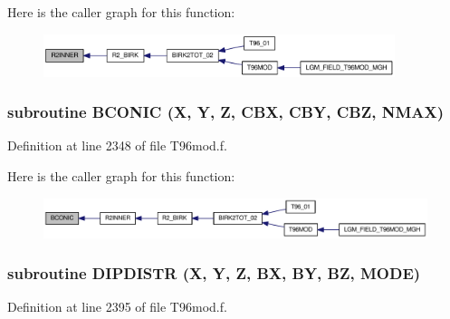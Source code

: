 Here is the caller graph for this function:\nopagebreak
\begin{figure}[H]
\begin{center}
\leavevmode
\includegraphics[width=291pt]{_t96mod_8f_717e6c5b669e682bef3f33b1a4a73796_icgraph}
\end{center}
\end{figure}
\hypertarget{_t96mod_8f_1a6fae1af90cf34b2b4e95d5ecde87a9}{
\subsubsection[{BCONIC}]{\setlength{\rightskip}{0pt plus 5cm}subroutine BCONIC (X, \/  Y, \/  Z, \/  CBX, \/  CBY, \/  CBZ, \/  NMAX)}}
\label{_t96mod_8f_1a6fae1af90cf34b2b4e95d5ecde87a9}




Definition at line 2348 of file T96mod.f.

Here is the caller graph for this function:\nopagebreak
\begin{figure}[H]
\begin{center}
\leavevmode
\includegraphics[width=336pt]{_t96mod_8f_1a6fae1af90cf34b2b4e95d5ecde87a9_icgraph}
\end{center}
\end{figure}
\hypertarget{_t96mod_8f_26863a8d653e16bfa831cf1cd3d57367}{
\subsubsection[{DIPDISTR}]{\setlength{\rightskip}{0pt plus 5cm}subroutine DIPDISTR (X, \/  Y, \/  Z, \/  BX, \/  BY, \/  BZ, \/  MODE)}}
\label{_t96mod_8f_26863a8d653e16bfa831cf1cd3d57367}




Definition at line 2395 of file T96mod.f.

